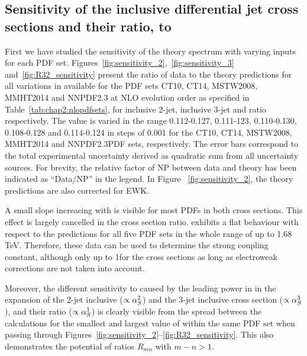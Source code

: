 \subsection{Sensitivity of the inclusive differential jet cross sections and their ratio, \texorpdfstring{\ratio}{R-32} to \texorpdfstring{\alpsmz}{alpha-S(M(Z))}}
\label{sec:sensitivity}

First we have studied the sensitivity of the theory spectrum with varying \alps inputs for each PDF set. Figures~\ref{fig:sensitivity_2},~\ref{fig:sensitivity_3} and~\ref{fig:R32_sensitivity} present the ratio of data to 
the theory predictions for all variations in \alpsmz available for the PDF sets CT10, CT14, MSTW2008, MMHT2014 and NNPDF2.3 at NLO 
evolution order as specified in Table~\ref{tab:chap2:nlopdfsets}, for inclusive 2-jet, inclusive 3-jet and ratio \ratio respectively. The \alpsmz value is varied in the range 0.112-0.127, 0.111-123, 0.110-0.130, 0.108-0.128 and 0.114-0.124 in steps of 0.001 for the CT10, CT14, MSTW2008, MMHT2014 and 
NNPDF2.3PDF sets, respectively. The error bars correspond to the total
experimental uncertainty derived as quadratic sum from all
uncertainty sources. For brevity, the relative factor of NP between data and theory has been indicated as ``Data/NP'' in the legend. In Figure ~\ref{fig:sensitivity_2}, the theory predictions are also corrected for EWK.

A small slope increasing with \httwo is visible for most PDFs in both cross sections.  This effect is largely cancelled in the cross section ratio. \ratio exhibits a flat behaviour with respect to the predictions for all five PDF sets in the whole range of \httwo up to 1.68 TeV. Therefore, these data can be used to determine the strong coupling constant, although only up to
1\TeV for the cross sections as long as electroweak corrections are
not taken into account.

Moreover, the different sensitivity to \alpsmz caused by the leading
power in \alps in the expansion of the 2-jet inclusive
($\propto\alpha_S^2$) and the 3-jet inclusive cross section
($\propto\alpha_S^3$), and their ratio ($\propto\alpha_S^1$) is clearly
visible from the spread between the calculations for the smallest and
largest value of \alpsmz within the same PDF set when passing through
Figures~\ref{fig:sensitivity_2}--\ref{fig:R32_sensitivity}.  This
also demonstrates the potential of ratios $R_{mn}$ with $m-n>1$.

